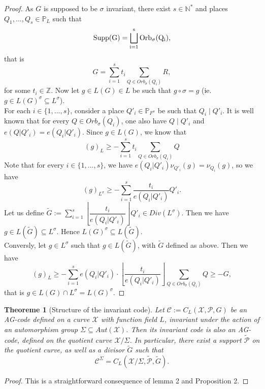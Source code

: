 \documentclass[10pt]{article}
\newtheorem{thm}{Theoreme}[]
\newcommand{\s}{\vspace{0.3cm}}
\newcommand{\cd}{\cdot}
\newcommand{\N}{\mathbb{N}}
\newcommand{\Z}{\mathbb{Z}}
\newcommand{\su}{\subseteq}
\newcommand{\X}{\mathcal{X}}
\newcommand{\PR}{\mathcal{P}}
\begin{document}
\begin{proof}
As $G$ is supposed to be $\sigma$ invariant, there exist $s \in \N^*$ and places $Q_1,...,Q_s \in \mathbb{P}_L$ such that 
\[\rm{Supp(G)} = \bigsqcup_{i=1}^s Orb_{\sigma}(Q_i),\]
that is 
\[G = \sum\limits_{i=1}^s t_i \sum\limits_{Q \in Orb_{\sigma}(Q_i)} R,\]
for some $t_i \in \Z$. Now let $g \in L(G) \in L$ be such that $g \circ \sigma = g$ (ie. $g \in L(G)^{\sigma} \su L^{\sigma}$). \\
For each $i \in \{1,...,s\}$, consider a place $Q'_i \in \mathbb{P}_{F^{\sigma}}$ be such that $Q_i \mid Q'_i$. It is well known that for every $Q \in Orb_{\sigma}(Q_i)$, one also have $Q \mid Q'_i$ and $e(Q|Q'_i)=e(Q_i|Q'_i)$. Since $g \in L(G)$, we know that
\[(g)_L \geq - \sum\limits_{i=1}^s t_i \sum\limits_{Q \in Orb_{\sigma}(Q_i)} Q\]
Note that for every $i \in \{1,...,s\}$, we have $e(Q_i|Q'_i)\nu_{Q'_i}(g) = \nu_{Q_i}(g)$, so we have 
\[(g)_{L^{\sigma}} \geq - \sum\limits_{i=1}^s \dfrac{t_i}{e(Q_i|Q'_i)}  Q'_i.\]
Let us define $\tilde{G}:= \sum\limits_{i=1}^s \left\lfloor\dfrac{t_i}{e(Q_i|Q'_i)}\right\rfloor  Q'_i \in Div(L^{\sigma})$. Then we have $g \in L(\tilde{G}) \su L^{\sigma}$. Hence $L(G)^{\sigma} \su L(\tilde{G})$. \\
Conversly, let $g \in L^{\sigma}$ such that $g \in L(\tilde{G})$, with $\tilde{G}$ defined as above. Then we have 
\[ (g)_L \geq -\sum\limits_{i=1}^s e(Q_i|Q'_i) \cd \left\lfloor\dfrac{t_i}{e(Q_i|Q'_i)}\right\rfloor \sum\limits_{Q \in Orb_{\sigma}(Q_i)} Q \geq -G,\]
that is $g \in L(G) \cap L^{\sigma} = L(G)^{\sigma}$.
\end{proof}

\s

\begin{thm} [Structure of the invariant code]
Let $\mathcal{C} := C_L(\X,\PR,G)$ be an AG-code defined on a curve $\X$ with function field $L$, invariant under the action of an automorphism group $\Sigma \su Aut(\X)$. Then its invariant code is also an AG-code, defined on the quotient curve $\X/\Sigma$. In particular, there exist a support $\tilde{\PR}$ on the quotient curve, as well as a divisor $\tilde{G}$ such that
\[\mathcal{C}^{\Sigma} = C_L(\X/\Sigma,\tilde{\PR},\tilde{G}).\]
\end{thm}

\s
 
\begin{proof}
This is a straightforward consequence of lemma 2 and Proposition 2.
\end{proof}
\end{document}
